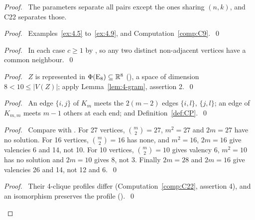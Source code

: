 \begin{proof}
 \pfsketch\ The parameters separate all pairs except the ones sharing $(n,k)$, and C22 separates
 those.
 \begin{proof}\pf\ Examples~\ref{ex:4.5} to~\ref{ex:4.9}, and
  Computation~\ref{comp:C9}.~\qed\end{proof}
 \begin{proof}\pf\ In each case $c\ge1$ by , so any two distinct
  non-adjacent vertices have a common neighbour.~\qed\end{proof}
 \begin{proof}\pf\ $Z$ is represented in $\Phi(\mathrm{E}_8)\subseteq{\mathbb R}^8$ (), a
  space of dimension $8<10\le|V(Z)|$; apply Lemma~\ref{lem:4-gram}, assertion
  2.~\qed\end{proof}
 \begin{proof}\pf\ An edge $\{i,j\}$ of $K_m$ meets the $2(m-2)$ edges $\{i,l\}$, $\{j,l\}$; an
  edge of $K_{m,m}$ meets $m-1$ others at each end; and Definition~\ref{def:CP}.~\qed\end{proof}
 \begin{proof}\pf\ Compare  with . For 27 vertices,
  $\binom m2=27$, $m^2=27$ and $2m=27$ have no solution. For 16 vertices, $\binom m2=16$ has none,
  and $m^2=16$, $2m=16$ give valencies 6 and 14, not 10. For 10 vertices, $\binom m2=10$ gives
  valency 6, $m^2=10$ has no solution and $2m=10$ gives 8, not 3. Finally $2m=28$ and $2m=16$
  give valencies 26 and 14, not 12 and 6.~\qed\end{proof}
 \begin{proof}\pf\ Their 4-clique profiles differ (Computation~\ref{comp:C22}, assertion 4), and
  an isomorphism preserves the profile ().~\qed\end{proof}

\end{proof}
